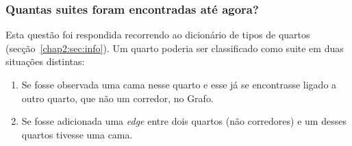 \subsubsection{Quantas suites foram encontradas até agora?}
\label{chap2:subsec:q2}

Esta questão foi respondida recorrendo ao dicionário de tipos de quartos (secção~\ref{chap2:sec:info}). Um quarto poderia ser classificado como suite em duas situações distintas:

\begin{enumerate}
    \item Se fosse observada uma cama nesse quarto e esse já se encontrasse ligado a outro quarto, que não um corredor, no Grafo.
    \item Se fosse adicionada uma \textit{edge} entre dois quartos (não corredores) e um desses quartos tivesse uma cama.
\end{enumerate}
